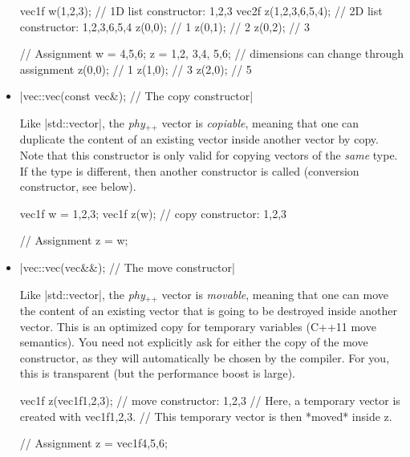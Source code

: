 \documentclass[12pt]{report}
\newcommand{\phypp}{\textit{phy}$_{\text{++}}$\xspace}
\newcommand{\stdvec}{\cppinline|std::vector|\xspace}
\newenvironment{example}
{
    \begin{mdframed}[style=example,frametitle={Example}]
}
{
    \end{mdframed}
}
\begin{document}
\begin{itemize}
\begin{example}
\begin{cppcode}
vec1f w({1,2,3}); // 1D list constructor: {1,2,3}
vec2f z({{1,2,3},{6,5,4}}); // 2D list constructor: {{1,2,3},{6,5,4}}
z(0,0); // 1
z(0,1); // 2
z(0,2); // 3

// Assignment
w = {4,5,6};
z = {{1,2}, {3,4}, {5,6}}; // dimensions can change through assignment
z(0,0); // 1
z(1,0); // 3
z(2,0); // 5
\end{cppcode}
\end{example}

\item \cppinline|vec::vec(const vec&); // The copy constructor|

Like \stdvec, the \phypp vector is \emph{copiable}, meaning that one can duplicate the content of an existing vector inside another vector by copy. Note that this constructor is only valid for copying vectors of the \emph{same} type. If the type is different, then another constructor is called (conversion constructor, see below).

\begin{example}
\begin{cppcode}
vec1f w = {1,2,3};
vec1f z(w); // copy constructor: {1,2,3}

// Assignment
z = w;
\end{cppcode}
\end{example}

\item \cppinline|vec::vec(vec&&); // The move constructor|

Like \stdvec, the \phypp vector is \emph{movable}, meaning that one can move the content of an existing vector that is going to be destroyed inside another vector. This is an optimized copy for temporary variables (C++11 move semantics). You need not explicitly ask for either the copy of the move constructor, as they will automatically be chosen by the compiler. For you, this is transparent (but the performance boost is large).

\begin{example}
\begin{cppcode}
vec1f z(vec1f{1,2,3}); // move constructor: {1,2,3}
// Here, a temporary vector is created with vec1f{1,2,3}.
// This temporary vector is then *moved* inside z.

// Assignment
z = vec1f{4,5,6};
\end{cppcode}
\end{example}


\end{itemize}
\end{document}
